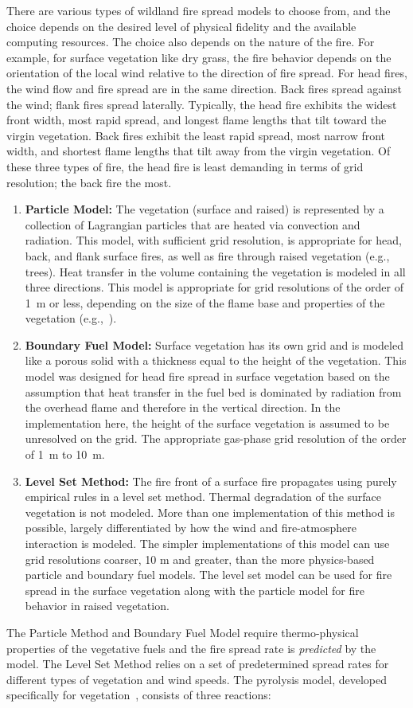 \documentclass[journal,article,atmosphere,submit,moreauthors,pdftex]{Definitions_Review_Process/mdpi}
\begin{document}
There are various types of wildland fire spread models to choose from, and the choice depends on the desired level of physical fidelity and the available computing resources. The choice also depends on the nature of the fire. For example, for surface vegetation like dry grass, the fire behavior depends on the orientation of the local wind relative to the direction of fire spread. For head fires, the wind flow and fire spread are in the same direction. Back fires spread against the wind; flank fires spread laterally. Typically, the head fire exhibits the widest front width, most rapid spread, and longest flame lengths that tilt toward the virgin vegetation. Back fires exhibit the least rapid spread, most narrow front width, and shortest flame lengths that tilt away from the virgin vegetation. Of these three types of fire, the head fire is least demanding in terms of grid resolution; the back fire the most.
\begin{enumerate}
\item {\bf Particle Model:} The vegetation (surface and raised) is represented by a collection of Lagrangian particles that are heated via convection and radiation. This model, with sufficient grid resolution, is appropriate for head, back, and flank surface fires, as well as fire through raised vegetation (e.g., trees). Heat transfer in the volume containing the vegetation is modeled in all three directions. This model is appropriate for grid resolutions of the order of 1~m or less, depending on the size of the flame base and properties of the vegetation (e.g.,~\cite{Perez-Ramirez:FT2017}).
\item {\bf Boundary Fuel Model:} Surface vegetation has its own grid and is modeled like a porous solid with a thickness equal to the height of the vegetation. This model was designed for head fire spread in surface vegetation based on the assumption that heat transfer in the fuel bed is dominated by radiation from the overhead flame and therefore in the vertical direction.  In the implementation here, the height of the surface vegetation is assumed to be unresolved on the grid. The appropriate gas-phase grid resolution of the order of 1~m to 10~m.
\item {\bf Level Set Method:} The fire front of a surface fire propagates using purely empirical rules in a level set method. Thermal degradation of the surface vegetation is not modeled. More than one implementation of this method is possible, largely differentiated by how the wind and fire-atmosphere interaction is modeled. The simpler implementations of this model can use grid resolutions coarser, 10 m and greater, than the more physics-based particle and boundary fuel models. The level set model can be used for fire spread in the surface vegetation along with the particle model for fire behavior in raised vegetation. 
\end{enumerate}
The Particle Method and Boundary Fuel Model require thermo-physical properties of the vegetative fuels and the fire spread rate is {\em predicted} by the model. The Level Set Method relies on a set of predetermined spread rates for different types of vegetation and wind speeds. The pyrolysis model, developed specifically for vegetation~\cite{Porterie:2006,Morvan:CF2004,Houssami:2016}, consists of three reactions:
\end{document}
